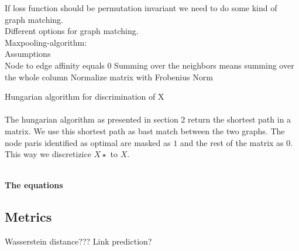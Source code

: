 If loss function should be permutation invariant we need to do some kind of graph matching.\\
Different options for graph matching.\\
Maxpooling-algorithm:\\
Assumptions\\
Node to edge affinity equals 0
Summing over the neighbors means summing over the whole column
Normalize matrix with Frobenius Norm


Hungarian algorithm for discrimination of X \\
\\
The hungarian algorithm as presented in section 2 return the shortest path in a matrix. We use this shortest path as bast match between the two graphs. The node paris identified as optimal are masked as $1$ and the rest of the matrix as $0$. This way we discretizice $X\star$ to $X$. 

\\
\textbf{The equations}

\subsection{Metrics}

Wasserstein distance???
Link prediction?
